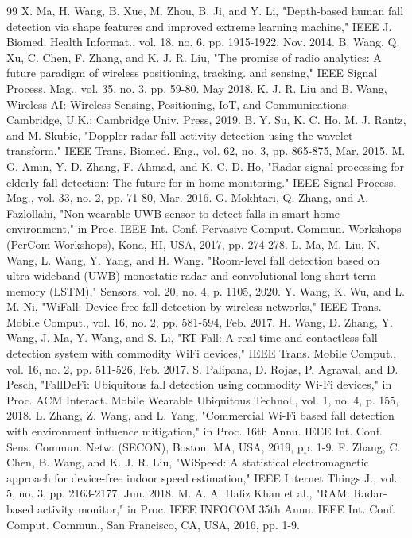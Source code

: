 \documentclass[journal]{IEEEtran}
\begin{document}
\begin{thebibliography}{99}
 X. Ma, H. Wang, B. Xue, M. Zhou, B. Ji, and Y. Li, "Depth-based human fall detection via shape features and improved extreme learning machine," IEEE J. Biomed. Health Informat., vol. 18, no. 6, pp. 1915-1922, Nov. 2014.
 B. Wang, Q. Xu, C. Chen, F. Zhang, and K. J. R. Liu, "The promise of radio analytics: A future paradigm of wireless positioning, tracking. and sensing," IEEE Signal Process. Mag., vol. 35, no. 3, pp. 59-80. May 2018.
 K. J. R. Liu and B. Wang, Wireless AI: Wireless Sensing, Positioning, IoT, and Communications. Cambridge, U.K.: Cambridge Univ. Press, 2019.
 B. Y. Su, K. C. Ho, M. J. Rantz, and M. Skubic, "Doppler radar fall activity detection using the wavelet transform," IEEE Trans. Biomed. Eng., vol. 62, no. 3, pp. 865-875, Mar. 2015.
 M. G. Amin, Y. D. Zhang, F. Ahmad, and K. C. D. Ho, "Radar signal processing for elderly fall detection: The future for in-home monitoring." IEEE Signal Process. Mag., vol. 33, no. 2, pp. 71-80, Mar. 2016.
 G. Mokhtari, Q. Zhang, and A. Fazlollahi, "Non-wearable UWB sensor to detect falls in smart home environment," in Proc. IEEE Int. Conf. Pervasive Comput. Commun. Workshops (PerCom Workshops), Kona, HI, USA, 2017, pp. 274-278.
 L. Ma, M. Liu, N. Wang, L. Wang, Y. Yang, and H. Wang. "Room-level fall detection based on ultra-wideband (UWB) monostatic radar and convolutional long short-term memory (LSTM)," Sensors, vol. 20, no. 4, p. 1105, 2020.
 Y. Wang, K. Wu, and L. M. Ni, "WiFall: Device-free fall detection by wireless networks," IEEE Trans. Mobile Comput., vol. 16, no. 2, pp. 581-594, Feb. 2017.
 H. Wang, D. Zhang, Y. Wang, J. Ma, Y. Wang, and S. Li, "RT-Fall: A real-time and contactless fall detection system with commodity WiFi devices," IEEE Trans. Mobile Comput., vol. 16, no. 2, pp. 511-526, Feb. 2017.
 S. Palipana, D. Rojas, P. Agrawal, and D. Pesch, "FallDeFi: Ubiquitous fall detection using commodity Wi-Fi devices," in Proc. ACM Interact. Mobile Wearable Ubiquitous Technol., vol. 1, no. 4, p. 155, 2018.
 L. Zhang, Z. Wang, and L. Yang, "Commercial Wi-Fi based fall detection with environment influence mitigation," in Proc. 16th Annu. IEEE Int. Conf. Sens. Commun. Netw. (SECON), Boston, MA, USA, 2019, pp. 1-9.
 F. Zhang, C. Chen, B. Wang, and K. J. R. Liu, "WiSpeed: A statistical electromagnetic approach for device-free indoor speed estimation," IEEE Internet Things J., vol. 5, no. 3, pp. 2163-2177, Jun. 2018.
 M. A. Al Hafiz Khan et al., "RAM: Radar-based activity monitor," in Proc. IEEE INFOCOM 35th Annu. IEEE Int. Conf. Comput. Commun., San Francisco, CA, USA, 2016, pp. 1-9.

\end{thebibliography}
\end{document}
